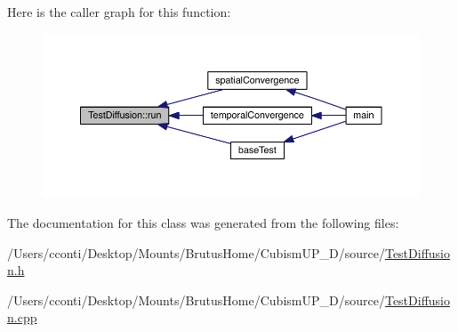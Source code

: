 Here is the caller graph for this function\+:
\nopagebreak
\begin{figure}[H]
\begin{center}
\leavevmode
\includegraphics[width=350pt]{d9/d0f/class_test_diffusion_ae4f122102bda38ee01e0fc38cb77f57b_icgraph}
\end{center}
\end{figure}




The documentation for this class was generated from the following files\+:\begin{DoxyCompactItemize}
\item 
/\+Users/cconti/\+Desktop/\+Mounts/\+Brutus\+Home/\+Cubism\+U\+P\+\_\+D/source/\hyperlink{_test_diffusion_8h}{Test\+Diffusion.\+h}\item 
/\+Users/cconti/\+Desktop/\+Mounts/\+Brutus\+Home/\+Cubism\+U\+P\+\_\+D/source/\hyperlink{_test_diffusion_8cpp}{Test\+Diffusion.\+cpp}\end{DoxyCompactItemize}
